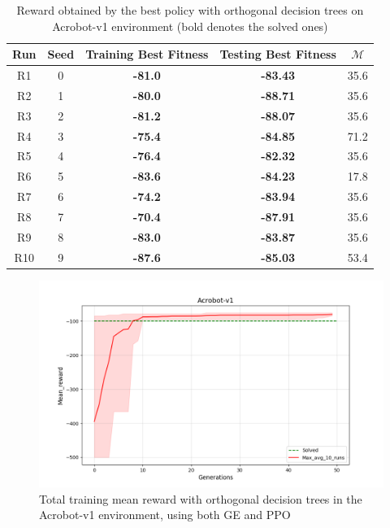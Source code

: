 \begin{table}[h!]
\begin{center}
\begin{tabular}{ |c|c|c|c|c| } 
\hline
\textbf{Run} & \textbf{Seed} & \textbf{Training Best Fitness} & \textbf{Testing Best Fitness} & $\mathcal{M}$\\
\hline
R1 & 0 & \textbf{-81.0} & \textbf{-83.43} & 35.6\\
R2 & 1 & \textbf{-80.0} & \textbf{-88.71} & 35.6\\
R3 & 2 & \textbf{-81.2} & \textbf{-88.07} & 35.6\\
R4 & 3 & \textbf{-75.4} & \textbf{-84.85} & 71.2\\
R5 & 4 & \textbf{-76.4} & \textbf{-82.32} & 35.6\\
R6 & 5 & \textbf{-83.6} & \textbf{-84.23} & 17.8\\
R7 & 6 & \textbf{-74.2} & \textbf{-83.94} & 35.6\\
R8 & 7 & \textbf{-70.4} & \textbf{-87.91} & 35.6\\
R9 & 8 & \textbf{-83.0} & \textbf{-83.87} & 35.6\\
R10 & 9 & \textbf{-87.6} & \textbf{-85.03} & 53.4\\
\hline
\end{tabular}
\caption{Reward obtained by the best policy with orthogonal decision trees on Acrobot-v1 environment (bold denotes the solved ones)}
\label{table:scoreAB}
\end{center}
\end{table}


\begin{figure}[h!]
    \centering
    \includegraphics[width=1\linewidth]{images/Acrobot/Acrobot10run.png}
    \caption{Total training mean reward with orthogonal decision trees in the Acrobot-v1 environment, using both GE and PPO}
    \label{fig:AcrobotMean}
\end{figure}

